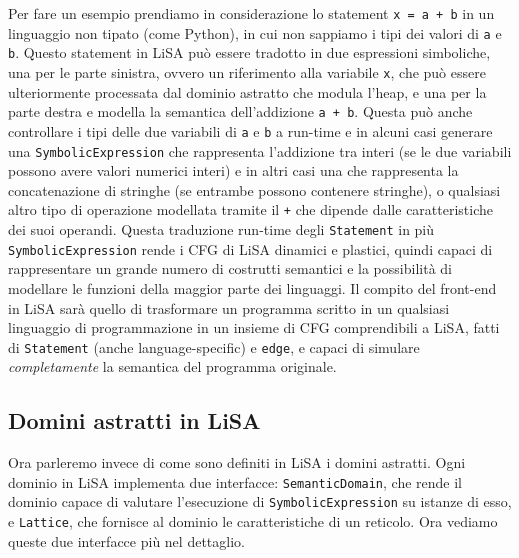 Per fare un esempio prendiamo in considerazione lo statement \texttt{x = a + b} in un linguaggio non tipato (come Python), in cui non sappiamo i tipi dei valori di \texttt{a} e \texttt{b}. Questo statement in LiSA può essere tradotto in due espressioni simboliche, una per le parte sinistra, ovvero un riferimento alla variabile \texttt{x}, che può essere ulteriormente processata dal dominio astratto che modula l'heap, e una per la parte destra e modella la semantica dell'addizione \texttt{a + b}. Questa può anche controllare i tipi delle due variabili di \texttt{a} e \texttt{b} a run-time e in alcuni casi generare una \texttt{SymbolicExpression} che rappresenta l'addizione tra interi (se le due variabili possono avere valori numerici interi) e in altri casi una che rappresenta la concatenazione di stringhe (se entrambe possono contenere stringhe), o qualsiasi altro tipo di operazione modellata tramite il \texttt{+} che dipende dalle caratteristiche dei suoi operandi.
Questa traduzione run-time degli \texttt{Statement} in più \texttt{SymbolicExpression} rende i CFG di LiSA dinamici e plastici, quindi capaci di rappresentare un grande numero di costrutti semantici e la possibilità di modellare le funzioni della maggior parte dei linguaggi. Il compito del front-end in LiSA sarà quello di trasformare un programma scritto in un qualsiasi linguaggio di programmazione in un insieme di CFG comprendibili a LiSA, fatti di \texttt{Statement} (anche language-specific) e \texttt{edge}, e capaci di simulare \textit{completamente} la semantica del programma originale.

\subsection{Domini astratti in LiSA}
Ora parleremo invece di come sono definiti in LiSA i domini astratti. Ogni dominio in LiSA implementa due interfacce: \texttt{SemanticDomain}, che rende il dominio capace di valutare l'esecuzione di \texttt{SymbolicExpression} su istanze di esso, e \texttt{Lattice}, che fornisce al dominio le caratteristiche di un reticolo. Ora vediamo queste due interfacce più nel dettaglio.

